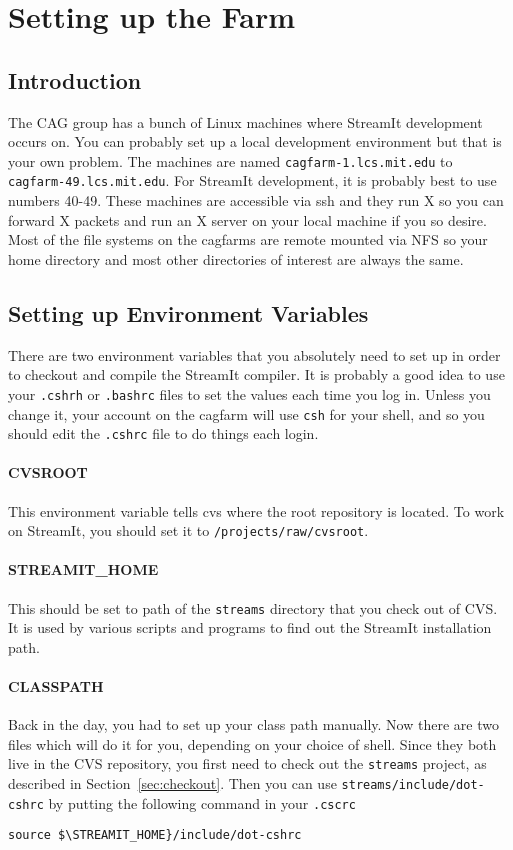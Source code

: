 \section{Setting up the Farm}

\subsection{Introduction}
The CAG group has a bunch of Linux machines where StreamIt development
occurs on. You can probably set up a local development environment
but that is your own problem. The machines are named {\tt cagfarm-1.lcs.mit.edu} to 
{\tt cagfarm-49.lcs.mit.edu}. For StreamIt development,
it is probably best to use numbers 40-49. These machines are accessible via ssh
and they run X so you can forward X packets and run an X server on
your local machine if you so desire. Most of the file systems on the 
cagfarms are remote mounted via NFS
so your home directory and most other directories of interest are
always the same.

\subsection{Setting up Environment Variables}
There are two environment variables that you absolutely need to set up
in order to checkout and compile the StreamIt compiler. It is probably
a good idea to use your {\tt .cshrh} or {\tt .bashrc} files to set
the values each time you log in. Unless you change it, your account
on the cagfarm will use {\tt csh} for your shell, and so you should
edit the {\tt .cshrc} file to do things each login.

\paragraph{CVSROOT}
This environment variable tells cvs where the root repository is 
located. To work on StreamIt, you should set it to 
{\tt /projects/raw/cvsroot}.

\paragraph{STREAMIT\_HOME}
This should be set to path of the {\tt streams} directory that 
you check out of CVS. It is used by various scripts and programs
to find out the StreamIt installation path.

\paragraph{CLASSPATH}
Back in the day, you had to set up your class path manually.
Now there are two files which will do it for you, depending
on your choice of shell. Since they both live in the CVS
repository, you first need to check out the {\tt streams} project,
as described in Section~\ref{sec:checkout}. Then you can
use {\tt streams/include/dot-cshrc} by putting the following
command in your {\tt .cscrc}
\begin{verbatim}
source $\STREAMIT_HOME}/include/dot-cshrc
\end{verbatim}

